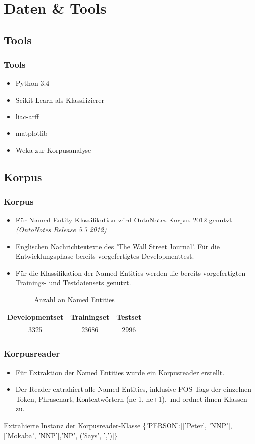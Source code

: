 \documentclass{beamer}
\begin{document}
\section{Daten \& Tools}
	\subsection{Tools}
	\begin{frame}
			\frametitle{Tools}
			\begin{itemize}
				\item Python 3.4+
				\item Scikit Learn als Klassifizierer
				\item liac-arff
				\item matplotlib
				\item Weka zur Korpusanalyse
			\end{itemize}
	\end{frame}
	\subsection{Korpus}
	\begin{frame}
			\frametitle{Korpus}
			\begin{itemize}
				\item Für Named Entity Klassifikation wird OntoNotes Korpus 2012 genutzt. \textit{(OntoNotes Release 5.0 2012)}
				\item Englischen Nachrichtentexte des 'The Wall Street Journal'.
				Für die Entwicklungsphase bereits vorgefertigtes Developmenttest.
				\item Für die Klassifikation der Named Entities werden die bereits vorgefertigten Trainings- und Testdatensets genutzt.
			\end{itemize}
			 \begin{table}
			 	\caption{Anzahl an  Named Entities}
			 	\begin{tabular}{ccc}
			 		\toprule
					Developmentset & Trainingset & Testset\\
			 		\midrule
					3325 & 23686 & 2996\\
			 		\bottomrule
			 	\end{tabular}
			 	\label{tab:datasets}
			 \end{table}
	\end{frame}
		\begin{frame}
			\frametitle{Korpusreader}
			\begin{itemize}
				\item Für Extraktion der Named Entities wurde ein Korpusreader erstellt.
				\item 	Der Reader extrahiert alle Named Entities, inklusive POS-Tags der einzelnen Token, Phrasenart, Kontextwörtern (ne-1, ne+1), und ordnet ihnen Klassen zu.
			\end{itemize}
			
			
		
			
			\begin{exampleblock}{Extrahierte Instanz der Korpusreader-Klasse}
				\{'PERSON':[['Peter', 'NNP'],['Mokaba', 'NNP'],'NP', ('Says', ',')]\}
			\end{exampleblock}
			
		\end{frame}
	
\end{document}
